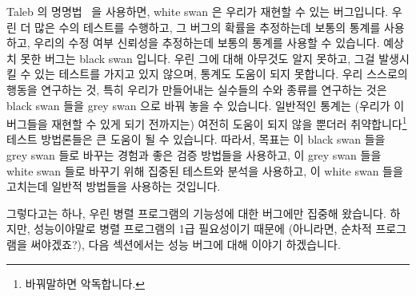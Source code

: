 Taleb 의 명명법~\cite{NassimTaleb2007BlackSwan} 을 사용하면, white swan 은
우리가 재현할 수 있는 버그입니다.
우린 더 많은 수의 테스트를 수행하고, 그 버그의 확률을 추정하는데 보통의 통계를
사용하고, 우리의 수정 여부 신뢰성을 추정하는데 보통의 통계를 사용할 수
있습니다.
예상치 못한 버그는 black swan 입니다.
우린 그에 대해 아무것도 알지 못하고, 그걸 발생시킬 수 있는 테스트를 가지고 있지
않으며, 통계도 도움이 되지 못합니다.
우리 스스로의 행동을 연구하는 것, 특히 우리가 만들어내는 실수들의 수와 종류를
연구하는 것은 black swan 들을 grey swan 으로 바꿔 놓을 수 있습니다.
일반적인 통계는 (우리가 이 버그들을 재현할 수 있게 되기 전까지는) 여전히 도움이
되지 않을 뿐더러 취약합니다\footnote{
	바꿔말하면 악독합니다.}
테스트 방법론들은 큰 도움이 될 수 있습니다.
따라서, 목표는 이 black swan 들을 grey swan 들로 바꾸는 경험과 좋은 검증
방법들을 사용하고, 이 grey swan 들을 white swan 들로 바꾸기 위해 집중된
테스트와 분석을 사용하고, 이 white swan 들을 고치는데 일반적 방법들을 사용하는
것입니다.

그렇다고는 하나, 우린 병렬 프로그램의 기능성에 대한 버그에만 집중해 왔습니다.
하지만, 성능이야말로 병렬 프로그램의 1급 필요성이기 때문에 (아니라면, 순차적
프로그램을 써야겠죠?), 다음 섹션에서는 성능 버그에 대해 이야기 하겠습니다.

